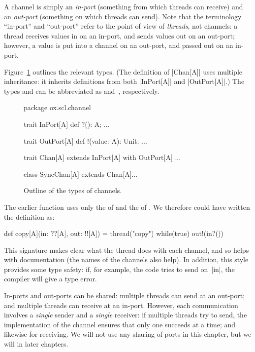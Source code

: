 
A channel is simply an \emph{in-port} (something from which threads can
receive) and an \emph{out-port} (something on which threads can send). 
Note that the terminology ``in-port'' and ``out-port'' refer to the point of
view of \emph{threads}, not channels: a thread receives values in on an
in-port, and sends values out on an out-port; however, a value is put into a
channel on an out-port, and passed out on an in-port.

Figure~\ref{fig:channel-types} outlines the relevant types.  (The definition
of |Chan[A]| uses multiple inheritance: it inherits definitions from both
|InPort[A]| and |OutPort[A]|.)  The types  and
 can be abbreviated as  and~\SCALA{!![A]},
respectively.


\begin{figure}
\begin{scala}
package ox.scl.channel

trait InPort[A]{ def ?(): A; ... }
        
trait OutPort[A]{ def !(value: A): Unit; ... }
  
trait Chan[A] extends InPort[A] with OutPort[A]{ ... }

class SyncChan[A] extends Chan[A]{...} 
\end{scala}
\caption{Outline of the types of channels.}
\label{fig:channel-types}
\end{figure}


The earlier function  uses only the  of 
and the  of .  We therefore could have written the
definition as:
%
\begin{scala}
  def copy[A](in: ??[A], out: !![A]) = thread("copy"){ 
    while(true) out!(in?()) 
  }
\end{scala}
%
This signature makes clear what the thread does with each channel, and so
helps with documentation (the names of the channels also help).  In addition,
this style provides some  type safety: if, for example, the code tries to send
on~|in|, the compiler will give a type error. 

In-ports and out-ports can be shared: multiple threads can send at an
out-port; and multiple threads can receive at an in-port.  However,
each communication involves a \emph{single} sender and a \emph{single}
receiver: if multiple  threads try to send, the implementation of the channel
ensures that only one succeeds at a time; and likewise for receiving.  We will
not use any sharing of ports in this chapter, but we will in later chapters.

